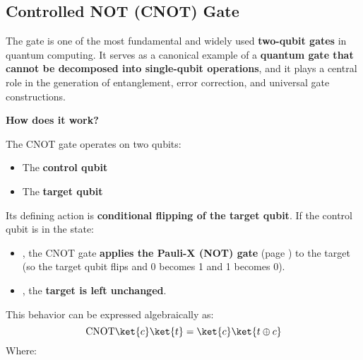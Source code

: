 \subsection{Controlled NOT (CNOT) Gate}\label{subsection: Controlled NOT Gate - CNOT}

The  gate is one of the most fundamental and widely used \textbf{two-qubit gates} in quantum computing. It serves as a canonical example of a \textbf{quantum gate that cannot be decomposed into single-qubit operations}, and it plays a central role in the generation of entanglement, error correction, and universal gate constructions.

\highspace
\begin{flushleft}
    \textcolor{Green3}{ \textbf{How does it work?}}
\end{flushleft}
The CNOT gate operates on two qubits:
\begin{itemize}
    \item The \textbf{control qubit} 
    \item The \textbf{target qubit} 
\end{itemize}
Its defining action is \textbf{conditional flipping of the target qubit}. If the control qubit is in the state:
\begin{itemize}
    \item {}, the CNOT gate \textbf{applies the Pauli-X (NOT) gate} (page \pageref{subsubsection: Pauli-X NOT Gate}) to the target (so the target qubit flips and 0 becomes 1 and 1 becomes 0).
    \item {}, the \textbf{target is left unchanged}.
\end{itemize}
This behavior can be expressed algebraically as:
\begin{equation}
    \text{CNOT} \ket{c}\ket{t} = \ket{c} \ket{t \oplus c}    
\end{equation}
Where:
